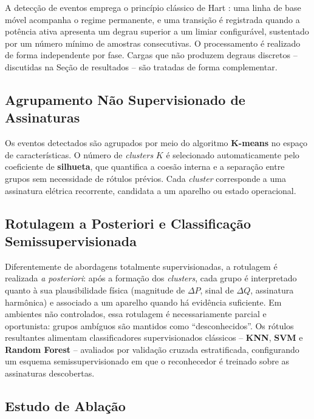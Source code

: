\documentclass[12pt]{article}
\begin{document}
A detec\c{c}\~ao de eventos emprega o princ\'ipio cl\'assico de Hart \cite{ref1}:
uma linha de base m\'ovel acompanha o regime permanente, e uma transi\c{c}\~ao
\'e registrada quando a pot\^encia ativa apresenta um degrau superior a um limiar
configur\'avel, sustentado por um n\'umero m\'inimo de amostras consecutivas. O
processamento \'e realizado de forma independente por fase. Cargas que n\~ao
produzem degraus discretos -- discutidas na Se\c{c}\~ao de resultados -- s\~ao
tratadas de forma complementar.

\subsection{Agrupamento N\~ao Supervisionado de Assinaturas}

Os eventos detectados s\~ao agrupados por meio do algoritmo \textbf{K-means} no
espa\c{c}o de caracter\'isticas. O n\'umero de \textit{clusters} $K$ \'e
selecionado automaticamente pelo coeficiente de \textbf{silhueta}, que quantifica
a coes\~ao interna e a separa\c{c}\~ao entre grupos sem necessidade de
r\'otulos pr\'evios. Cada \textit{cluster} corresponde a uma assinatura
el\'etrica recorrente, candidata a um aparelho ou estado operacional.

\subsection{Rotulagem a Posteriori e Classifica\c{c}\~ao Semissupervisionada}

Diferentemente de abordagens totalmente supervisionadas, a rotulagem \'e
realizada \textit{a posteriori}: ap\'os a forma\c{c}\~ao dos \textit{clusters},
cada grupo \'e interpretado quanto \`a sua plausibilidade f\'isica
(magnitude de $\Delta P$, sinal de $\Delta Q$, assinatura harm\^onica) e
associado a um aparelho quando h\'a evid\^encia suficiente. Em ambientes n\~ao
controlados, essa rotulagem \'e necessariamente parcial e oportunista: grupos
amb\'iguos s\~ao mantidos como ``desconhecidos''. Os r\'otulos resultantes
alimentam classificadores supervisionados cl\'assicos -- \textbf{KNN}, \textbf{SVM}
e \textbf{Random Forest} -- avaliados por valida\c{c}\~ao cruzada estratificada,
configurando um esquema semissupervisionado em que o reconhecedor \'e treinado
sobre as assinaturas descobertas.

\subsection{Estudo de Abla\c{c}\~ao}
\end{document}
